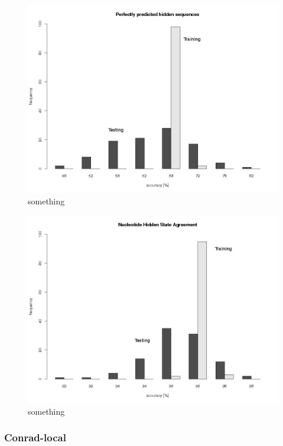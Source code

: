 \begin{figure}[ht]
	\begin{center}
		\includegraphics[scale=0.42]{pics/perfectm.jpg}
	\caption{something}
	\end{center}
	\label{fig:perfect}
\end{figure}

\begin{figure}[ht]
	\begin{center}
		\includegraphics[scale=0.42]{pics/stateAgreementm.jpg}
	\caption{something}
	\end{center}
	\label{fig:stateAgreement}
\end{figure}
\subsubsection{Conrad-local}
